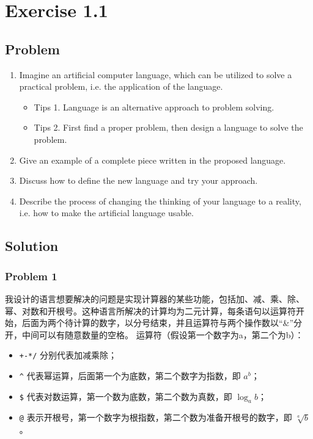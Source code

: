 \chapter{Exercise 1.1}

\section{Problem}

\begin{enumerate}
    \item Imagine an artificial computer language, which can be utilized to solve a practical problem, i.e. the application of the language.
    \begin{itemize}
        \item Tips 1. Language is an alternative approach to problem solving.
        \item Tips 2. First find a proper problem, then design a language to solve the problem.
    \end{itemize}
    \item Give an example of a complete piece written in the proposed language.
    \item Discuss how to define the new language and try your approach.
    \item Describe the process of changing the thinking of your language to a reality, i.e. how to make the artificial language usable.

\end{enumerate}

\section{Solution}

\subsection{Problem 1}

我设计的语言想要解决的问题是实现计算器的某些功能，包括加、减、乘、除、幂、对数和开根号。这种语言所解决的计算均为二元计算，每条语句以运算符开始，后面为两个待计算的数字，以分号结束，并且运算符与两个操作数以“\&”分开，中间可以有随意数量的空格。
运算符（假设第一个数字为a，第二个为b）：
\begin{itemize}
    \item \texttt{+-*/} 分别代表加减乘除；
    \item \texttt{\string^} 代表幂运算，后面第一个为底数，第二个数字为指数，即 $a^b$；
    \item \texttt{\$} 代表对数运算，第一个数为底数，第二个数为真数，即 $\log_a b$；
    \item \texttt{@} 表示开根号，第一个数字为根指数，第二个数为准备开根号的数字，即 $\sqrt[a]{b}$。
\end{itemize}

